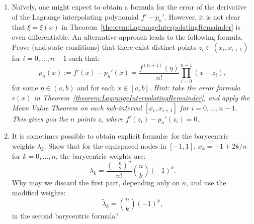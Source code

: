 \begin{enumerate}
\item Na\"ively, one might expect to obtain a formula for the error of the derivative of the Lagrange interpolating polynomial $f'-p_n'$. However, it is not clear that $\xi = \xi(x)$ in Theorem~\ref{theorem:LagrangeInterpolatingRemainder} is even differentiable. An alternative approach leads to the following formula. Prove (and state conditions) that there exist distinct points $z_i\in(x_i,x_{i+1})$ for $i=0,\ldots,n-1$ such that:
\[
\rho_n(x) := f'(x) - p_n'(x) = \dfrac{f^{(n+1)}(\eta)}{n!}\prod_{i=0}^{n-1}(x-z_i),
\]
for some $\eta\in(a,b)$ and for each $x\in[a,b]$. {\em Hint: take the error formula $r(x)$ in Theorem~\ref{theorem:LagrangeInterpolatingRemainder}, and apply the Mean Value Theorem on each sub-interval $[x_i,x_{i+1}]$ for $i=0,\ldots,n-1$. This gives you the $n$ points $z_i$ where $f'(z_i) - p_n'(z_i) = 0$.}
\item It is sometimes possible to obtain explicit formul\ae~for the barycentric weights $\lambda_k$. Show that for the equispaced nodes in $[-1,1]$, $x_k = -1 + 2k/n$ for $k=0,\ldots,n$, the barycentric weights are:
\[
\lambda_k = \dfrac{(-\tfrac{n}{2})^n}{n!}\binom{n}{k}(-1)^k.
\]
Why may we discard the first part, depending only on $n$, and use the modified weights:
\[
\tilde{\lambda}_k = \binom{n}{k}(-1)^k,
\]
in the second barycentric formula?

\end{enumerate}
